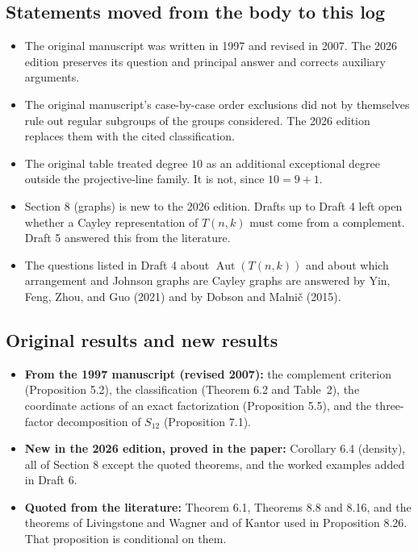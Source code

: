 \documentclass[12pt,letterpaper]{article}
\begin{document}
\subsection{Statements moved from the body to this log}\label{sec:moved}
\begin{itemize}
\item The original manuscript was written in 1997 and revised in 2007. The 2026 edition preserves its question and principal answer and corrects auxiliary arguments.
\item The original manuscript's case-by-case order exclusions did not by themselves rule out regular subgroups of the groups considered. The 2026 edition replaces them with the cited classification.
\item The original table treated degree $10$ as an additional exceptional degree outside the projective-line family. It is not, since $10=9+1$.
\item Section 8 (graphs) is new to the 2026 edition. Drafts up to Draft 4 left open whether a Cayley representation of $T(n,k)$ must come from a complement. Draft 5 answered this from the literature.
\item The questions listed in Draft 4 about $\operatorname{Aut}(T(n,k))$ and about which arrangement and Johnson graphs are Cayley graphs are answered by Yin, Feng, Zhou, and Guo (2021) and by Dobson and Malni\v{c} (2015).
\end{itemize}

\subsection{Original results and new results}
\begin{itemize}
\item \textbf{From the 1997 manuscript (revised 2007):} the complement criterion (Proposition 5.2), the classification (Theorem 6.2 and Table~2), the coordinate actions of an exact factorization (Proposition 5.5), and the three-factor decomposition of $S_{12}$ (Proposition 7.1).
\item \textbf{New in the 2026 edition, proved in the paper:} Corollary 6.4 (density), all of Section 8 except the quoted theorems, and the worked examples added in Draft 6.
\item \textbf{Quoted from the literature:} Theorem 6.1, Theorems 8.8 and 8.16, and the theorems of Livingstone and Wagner and of Kantor used in Proposition 8.26. That proposition is conditional on them.
\end{itemize}
\end{document}
